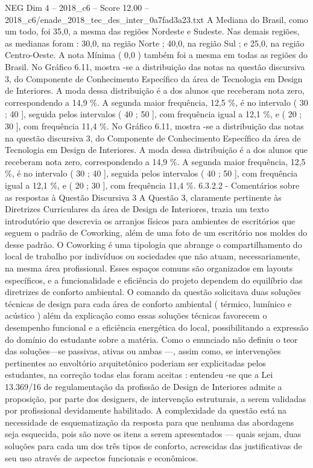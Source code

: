 \begin{textsample}{NEG Dim 4 – 2018\_c6 – Score 12.00 – 2018\_c6/enade\_2018\_tec\_des\_inter\_0a7fad3a23.txt}
A Mediana do Brasil, como um todo, foi 35,0, a mesma das regiões Nordeste e Sudeste.
Nas demais regiões, as medianas foram : 30,0, na região Norte ; 40,0, na região Sul ; e 25,0, na região Centro-Oeste.
A nota Mínima ( 0,0 ) também foi a mesma em todas as regiões do Brasil.
No Gráfico 6.11, mostra -se a distribuição das notas na questão discursiva 3, do Componente de Conhecimento Específico da área de Tecnologia em Design de Interiores.
A moda dessa distribuição é a dos alunos que receberam nota zero, correspondendo a 14,9 \%.
A segunda maior frequência, 12,5 \%, é no intervalo ( 30 ; 40 ], seguida pelos intervalos ( 40 ; 50 ], com frequência igual a 12,1 \%, e ( 20 ; 30 ], com frequência 11,4 \%.
No Gráfico 6.11, mostra -se a distribuição das notas na questão discursiva 3, do Componente de Conhecimento Específico da área de Tecnologia em Design de Interiores.
A moda dessa distribuição é a dos alunos que receberam nota zero, correspondendo a 14,9 \%.
A segunda maior frequência, 12,5 \%, é no intervalo ( 30 ; 40 ], seguida pelos intervalos ( 40 ; 50 ], com frequência igual a 12,1 \%, e ( 20 ; 30 ], com frequência 11,4 \%. 6.3.2.2 - Comentários sobre as respostas à Questão Discursiva 3 A Questão 3, claramente pertinente às Diretrizes Curriculares da área de Design de Interiores, trazia um texto introdutório que descrevia os arranjos físicos para ambientes de escritórios que seguem o padrão de Coworking, além de uma foto de um escritório nos moldes do desse padrão.
O Coworking é uma tipologia que abrange o compartilhamento do local de trabalho por indivíduos ou sociedades que não atuam, necessariamente, na mesma área profissional.
Esses espaços comuns são organizados em layouts específicos, e a funcionalidade e eficiência do projeto dependem do equilíbrio das diretrizes de conforto ambiental.
O comando da questão solicitava duas soluções técnicas de design para cada área de conforto ambiental ( térmico, lumínico e acústico ) além da explicação como essas soluções técnicas favorecem o desempenho funcional e a eficiência energética do local, possibilitando a expressão do domínio do estudante sobre a matéria.
Como o enunciado não definiu o teor das soluções—se passivas, ativas ou ambas —, assim como, se intervenções pertinentes ao envoltório arquitetônico poderiam ser explicitadas pelos estudantes, na correção todas elas foram aceitas : entendeu -se que a Lei 13.369/16 de regulamentação da profissão de Design de Interiores admite a proposição, por parte dos designers, de intervenção estruturais, a serem validadas por profissional devidamente habilitado.
A complexidade da questão está na necessidade de esquematização da resposta para que nenhuma das abordagens seja esquecida, pois são nove os itens a serem apresentados — quais sejam, duas soluções para cada um dos três tipos de conforto, acrescidas das justificativas de seu uso através de aspectos funcionais e econômicos.

\end{textsample}
